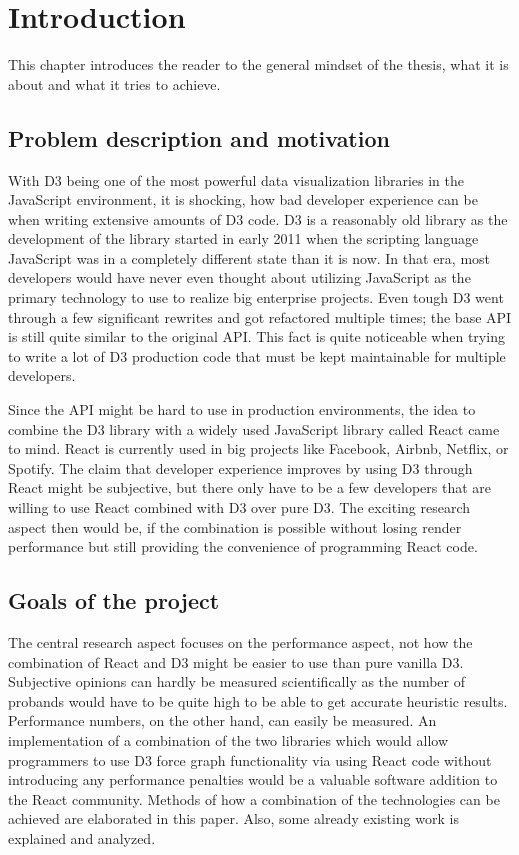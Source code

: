 \chapter{Introduction}
\label{cha:Introduction}

This chapter introduces the reader to the general mindset of the thesis, what it is about and what it tries to achieve.

\section{Problem description and motivation}

With D3 being one of the most powerful data visualization libraries in the JavaScript environment, it is shocking, how bad developer experience can be when writing extensive amounts of D3 code. D3 is a reasonably old library as the development of the library started in early 2011 when the scripting language JavaScript was in a completely different state than it is now. In that era, most developers would have never even thought about utilizing JavaScript as the primary technology to use to realize big enterprise projects. Even tough D3 went through a few significant rewrites and got refactored multiple times; the base API is still quite similar to the original API. This fact is quite noticeable when trying to write a lot of D3 production code that must be kept maintainable for multiple developers.

Since the API might be hard to use in production environments, the idea to combine the D3 library with a widely used JavaScript library called React came to mind. React is currently used in big projects like Facebook, Airbnb, Netflix, or Spotify. The claim that developer experience improves by using D3 through React might be subjective, but there only have to be a few developers that are willing to use React combined with D3 over pure D3. The exciting research aspect then would be, if the combination is possible without losing render performance but still providing the convenience of programming React code.

\section{Goals of the project}

The central research aspect focuses on the performance aspect, not how the combination of React and D3 might be easier to use than pure vanilla D3. Subjective opinions can hardly be measured scientifically as the number of probands would have to be quite high to be able to get accurate heuristic results. Performance numbers, on the other hand, can easily be measured. An implementation of a combination of the two libraries which would allow programmers to use D3 force graph functionality via using React code without introducing any performance penalties would be a valuable software addition to the React community. Methods of how a combination of the technologies can be achieved are elaborated in this paper. Also, some already existing work is explained and analyzed.

